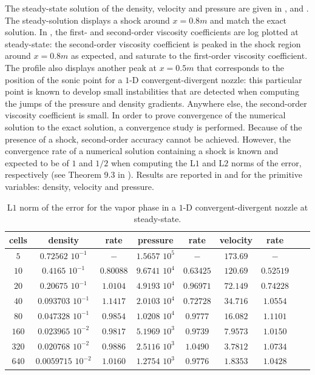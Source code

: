 The steady-state solution of the density, velocity and pressure are given in ,  and . The steady-solution displays a shock around $x=0.8m$ and match the exact solution. In , the first- and second-order viscosity coefficients are log plotted at steady-state: the second-order viscosity coefficient is peaked in the shock region around $x=0.8m$ as expected, and saturate to the first-order viscosity coefficient. The profile also displays another peak at $x=0.5m$ that corresponds to the position of the sonic point for a $1$-D convergent-divergent nozzle: this particular point is known to develop small instabilities that are detected when computing the jumps of the pressure and density gradients. Anywhere else, the second-order viscosity coefficient is small. In order to prove convergence of the numerical solution to the exact solution, a convergence study is performed. Because of the presence of a shock, second-order accuracy cannot be achieved. However, the convergence rate of a numerical solution containing a shock  is known and expected to be of $1$ and $1/2$ when computing the L$1$ and L$2$ norms of the error, respectively (see Theorem 9.3 in \cite{convergence_book}). Results are reported in  and  for the primitive variables: density, velocity and pressure.
\begin{table}[H]
\begin{center}
 \caption{\label{tbl:l1_norm_vap} L$1$ norm of the error for the vapor phase in a $1$-D convergent-divergent nozzle at steady-state.}
 \begin{tabular}{|c|c|c|c|c|c|c|c|c|}
 \hline
   cells & density & rate & pressure & rate & velocity & rate \\
 \hline
$5$ &   $0.72562$ $10^{-1}$ & $-$ & $1.5657$ $10^{5}$ & $-$ & $173.69$                   & $-$\\
  \hline
$10$  &  $0.4165$ $10^{-1}$ & $0.80088$ & $9.6741$ $10^{4}$ & $0.63425$ & $120.69$ & $0.52519$\\
   \hline
$20$ & $0.20675$ $10^{-1}$ & $1.0104$ & $4.9193$ $10^{4}$ & $0.96971$ & $72.149$& $0.74228$\\
 \hline
$40$ & $0.093703$ $10^{-1}$ & $1.1417$ & $2.0103$ $10^{4}$ & $0.72728$ & $34.716$& $1.0554$\\
 \hline
$80$ & $0.047328$ $10^{-1}$ & $0.9854$ & $1.0208$ $10^{4}$ & $0.9777$ & $16.082$& $1.1101$\\
 \hline
$160$&$0.023965$ $10^{-2}$ & $0.9817$ & $5.1969$ $10^{3}$ & $0.9739$ & $7.9573$& $1.0150$\\
 \hline
$320$&$0.020768$ $10^{-2}$& $0.9886$ & $2.5116$ $10^{3}$ & $1.0490$ & $3.7812$& $1.0734$\\
 \hline
 $640$&$0.0059715$ $10^{-2}$& $1.0160$ & $1.2754$ $10^{3}$ & $0.9776$ & $1.8353$& $1.0428$\\
 \hline
\end{tabular}
\end{center}
\nonumber
\end{table}
